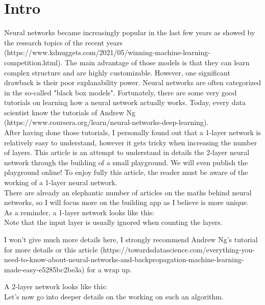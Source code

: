 \section{Intro}

Neural networks became increasingly popular in the last few years as showed by the research topics of the recent years (https://www.kdnuggets.com/2021/05/winning-machine-learning-competition.html). The main advantage of those models is that they can learn complex structure and are highly customizable. However, one significant drawback is their poor explanability power. Neural networks are often categorized in the so-called "black box models".
Fortunately, there are some very good tutorials on learning how a neural network actually works. Today, every data scientist know the tutorials of Andrew Ng (https://www.coursera.org/learn/neural-networks-deep-learning). \\

After having done those tutorials, I personally found out that a 1-layer network is relatively easy to understand, however it gets tricky when increasing the number of layers. This article is an attempt to understand in details the 2-layer neural network through the building of a small playground. We will even publish the playground online! To enjoy fully this article, the reader must be aware of the working of a 1-layer neural network.\\

There are already an elephantic number of articles on the maths behind neural networks, so I will focus more on the building app as I believe is more unique. \\

As a reminder, a 1-layer network looks like this: \\

Note that the input layer is usually ignored when counting the layers.

I won't give much more details here, I strongly recommend Andrew Ng's tutorial for more details or this article (https://towardsdatascience.com/everything-you-need-to-know-about-neural-networks-and-backpropagation-machine-learning-made-easy-e5285bc2be3a) for a wrap up.

A 2-layer network looks like this: \\

Let's now go into deeper details on the working on such an algorithm.
